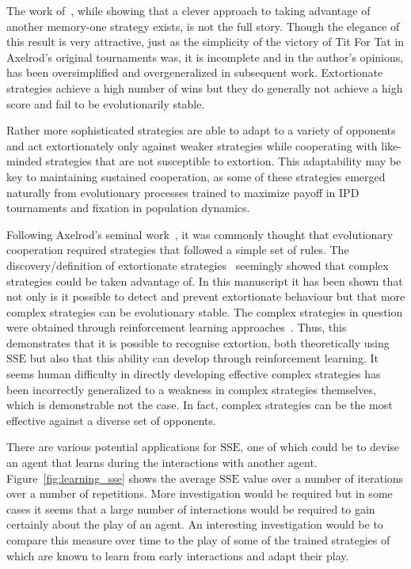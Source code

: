 \documentclass[a4paper]{article}
\newcommand{\SSe}{\text{SSE}}
\begin{document}
The work of~\cite{Press2012}, while showing that a clever approach to taking
advantage of another memory-one strategy exists, is not the full story.
Though the elegance of this result is very attractive, just as the simplicity of
the victory of Tit For Tat in Axelrod's original tournaments was, it is
incomplete and in the author's opinions, has been oversimplified and
overgeneralized in subsequent work. Extortionate strategies achieve a high
number of wins but they do generally not achieve a high score and fail to be
evolutionarily stable.

Rather more sophisticated strategies are able to adapt to a variety of opponents
and act extortionately only against weaker strategies while cooperating with
like-minded strategies that are not susceptible to extortion. This adaptability
may be key to maintaining sustained cooperation, as some of these strategies
emerged naturally from evolutionary processes trained to maximize payoff in
IPD tournaments and fixation in population dynamics.

Following Axelrod's seminal work~\cite{Axelrod1980, Axelrod1980a}, it was
commonly thought that evolutionary cooperation required strategies that followed
a simple set of rules. The discovery/definition of extortionate
strategies~\cite{Press2012} seemingly showed that complex strategies could be
taken advantage of. In this manuscript it has been shown that not only is it
possible to detect and prevent extortionate behaviour but that more complex
strategies can be evolutionary stable. The complex strategies in question were
obtained through reinforcement learning approaches~\cite{Harper2017, Moran1707}.
Thus, this demonstrates that it is possible to recognise extortion, both
theoretically using \(\SSe\) but also that this ability can develop through
reinforcement learning. It seems human difficulty in directly developing
effective complex strategies has been incorrectly generalized to a weakness
in complex strategies themselves, which is demonstrable not the case. In fact,
complex strategies can be the most effective against a diverse set of opponents.

There are various potential applications for \(\SSe\), one of which could be to
devise an agent that learns during the interactions with another agent.
Figure~\ref{fig:learning_sse} shows the average \(\SSe\) value over a number of
iterations over a number of repetitions. More investigation would be required
but in some cases it seems that a large number of interactions would be required
to gain certainly about the play of an agent. An interesting investigation would
be to compare this measure over time to the play of some of the trained
strategies of~\cite{Harper2017} which are known to learn from early interactions
and adapt their play.
\end{document}
